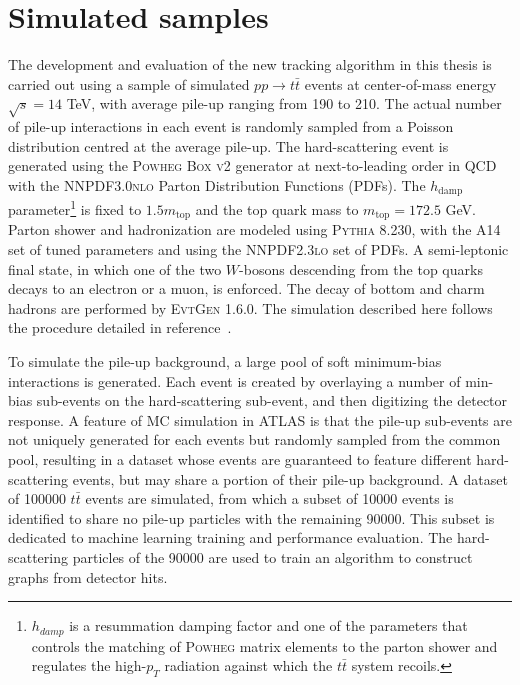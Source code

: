 \section{Simulated samples}
\label{sect:simulated-samples}
The development and evaluation of the new tracking algorithm in this thesis is carried out using a sample of simulated $pp\rightarrow t\bar{t}$ events at center-of-mass energy $\sqrt{s}=14$ TeV, with average pile-up ranging from 190 to 210.
The actual number of pile-up interactions in each event is randomly sampled from a Poisson distribution centred at the average pile-up. 
The hard-scattering event is generated using the \textsc{Powheg Box v2} \cite{Frixione:2002ik, Frixione:2007vw, Nason:2004rx, Alioli:2010xd} generator at next-to-leading order in QCD with the \textsc{NNPDF3.0nlo} \cite{Ball:2014uwa} Parton Distribution Functions (PDFs).
The $h_{\mathrm{damp}}$ parameter\footnote{ $h_{damp}$ is a resummation damping factor and one of the parameters that controls the matching of \textsc{Powheg} matrix elements to the parton shower and regulates the high-$p_T$ radiation against which the $t\bar{t}$ system recoils. } is fixed to $1.5m_{\mathrm{top}}$ \cite{ATL-PHYS-PUB-2016-020} and the top quark mass to $m_{\mathrm{top}} = 172.5$ GeV.
Parton shower and hadronization are modeled using \textsc{Pythia 8.230}\cite{Sjostrand:2014zea}, with the A14 set of tuned parameters \cite{ATL-PHYS-PUB-2014-021} and using the \textsc{NNPDF2.3lo} \cite{Ball:2012cx} set of PDFs.
A semi-leptonic final state, in which one of the two $W$-bosons descending from the top quarks decays to an electron or a muon, is enforced. 
The decay of bottom and charm hadrons are performed by \textsc{EvtGen 1.6.0}\cite{Lange:2001uf}.
The simulation described here follows the procedure detailed in reference~\cite{Aad_2025}.

To simulate the pile-up background, a large pool of soft minimum-bias interactions is generated. 
Each event is created by overlaying a number of min-bias sub-events on the hard-scattering sub-event, and then digitizing the detector response. 
A feature of MC simulation in ATLAS is that the pile-up sub-events are not uniquely generated for each events but randomly sampled from the common pool, resulting in a dataset whose events are guaranteed to feature different hard-scattering events, but may share a portion of their pile-up background. 
A dataset of 100000 $t\bar{t}$ events are simulated, from which a subset of 10000 events is identified to share no pile-up particles with the remaining 90000.
This subset is dedicated to machine learning training and performance evaluation.
The hard-scattering particles of the 90000 are used to train an algorithm to construct graphs from detector hits.

